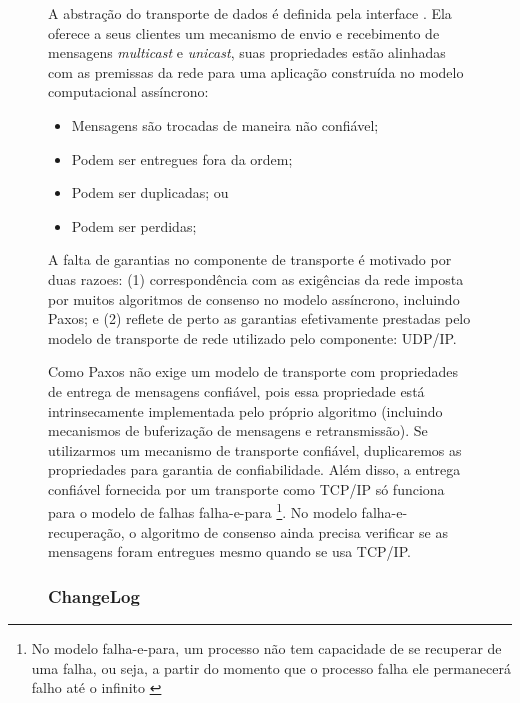 \begin{figure}[ht]
A abstração do transporte de dados é definida pela interface . Ela
oferece a seus clientes um mecanismo de envio e recebimento de mensagens \emph{multicast}
e \emph{unicast}, suas propriedades estão alinhadas com as premissas da rede para uma
aplicação construída no modelo computacional assíncrono:

\begin{itemize}
  \item Mensagens são trocadas de maneira não confiável;
  \item Podem ser entregues fora da ordem;
  \item Podem ser duplicadas; ou
  \item Podem ser perdidas;
\end{itemize}

A falta de garantias no componente de transporte é motivado por duas razoes: (1)
correspondência com as exigências da rede imposta por muitos algoritmos de consenso no
modelo assíncrono, incluindo Paxos; e (2) reflete de perto as garantias efetivamente
prestadas pelo modelo de transporte de rede utilizado pelo componente: UDP/IP.

Como Paxos não exige um modelo de transporte com propriedades de entrega de mensagens
confiável, pois essa propriedade está intrinsecamente implementada pelo próprio algoritmo
(incluindo mecanismos de buferização de mensagens e retransmissão). Se utilizarmos um
mecanismo de transporte confiável, duplicaremos as propriedades para garantia de
confiabilidade. Além disso, a entrega confiável fornecida por um transporte como TCP/IP só
funciona para o modelo de falhas falha-e-para \cite{abdellatif04} \footnote{No modelo
falha-e-para, um processo não tem capacidade de se recuperar de uma falha, ou seja, a
partir do momento que o processo falha ele permanecerá falho até o infinito
\cite{cachin11}}. No modelo falha-e-recuperação, o algoritmo de consenso ainda precisa
verificar se as mensagens foram entregues mesmo quando se usa TCP/IP.

\subsubsection{ChangeLog}


\end{figure}
